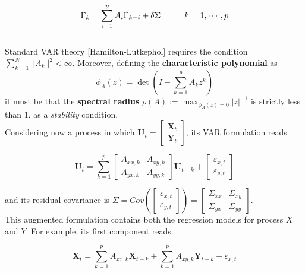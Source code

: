 \documentclass[12pt, a4paper]{article}
\begin{document}
\begin{equation}
\Gamma_k = \sum_{i=1}^{p} A_i \Gamma_{k-i} + \delta \Sigma \hspace{1 cm }  k = 1, \cdots, p \label{Yule-Walker}
\end{equation}\\

Standard VAR theory [Hamilton-Lutkephol] requires the condition $ \sum_{k=1}^{N}||A_k||^2 < \infty $. Moreover, defining the \textbf{characteristic polynomial} as 
$$ \phi_A(z)= \det \left( I - \sum_{k=1}^{p} A_k z^k \right) $$
it must be that the \textbf{spectral radius} $\rho(A) := \max_{\phi_A(z)=0}|z|^{-1}$ is strictly less than $1$, as a \textit{stability} condition.
\\

Considering now a process in which $ \textbf{U}_t = \begin{bmatrix} \textbf{X}_t  \\  \textbf{Y}_t \end{bmatrix} $, its VAR formulation reads

\begin{equation}
\textbf{U}_t = \sum_{k=1}^{p} \begin{bmatrix} A_{xx,k}  &  A_{xy,k} \\  A_{yx,k}  & A_{yy,k} \end{bmatrix} \textbf{U}_{t-k} + \begin{bmatrix} \varepsilon_{x,t}  \\  \varepsilon_{y,t} \end{bmatrix}
\end{equation}


and its residual covariance is $ \Sigma = Cov\left(\begin{bmatrix} \varepsilon_{x,t}  \\  \varepsilon_{y,t} \end{bmatrix}\right) = \begin{bmatrix} \Sigma_{xx}  &  \Sigma_{xy} \\  \Sigma_{yx}  & \Sigma_{yy} \end{bmatrix} $.\\

This augmented formulation contains both the regression models for process $X$ and $Y$. For example, its first component reads

\begin{equation}
\textbf{X}_t = \sum_{k=1}^{p} A_{xx,k} \textbf{X}_{t-k} + \sum_{k=1}^{p} A_{xy,k}  \textbf{Y}_{t-k} + \varepsilon_{x,t}
\end{equation}
\end{document}

